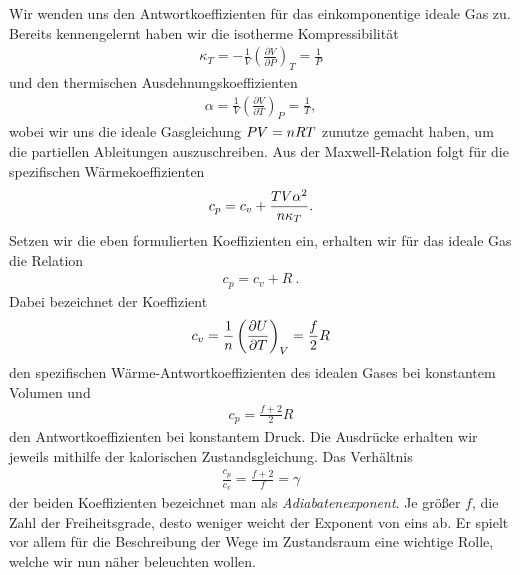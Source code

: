 Wir wenden uns den Antwortkoeffizienten für das einkomponentige ideale Gas zu. Bereits kennengelernt haben wir die isotherme Kompressibilität
\begin{align*}
    \kappa_T=-\frac{1}{V}\left(\frac{\partial V}{\partial P}\right)_T=\frac{1}{P}
\end{align*}
und den thermischen Ausdehnungskoeffizienten
\begin{align*}
    \alpha=\frac{1}{V}\left(\frac{\partial V}{\partial T}\right)_P=\frac{1}{T},
\end{align*}
wobei wir uns die ideale Gasgleichung $PV=n RT$ zunutze gemacht haben, um die partiellen Ableitungen auszuschreiben.
Aus der Maxwell-Relation folgt für die spezifischen Wärmekoeffizienten
\begin{align*}
    c_p=c_v+\frac{TV\alpha^2}{n \kappa_T}.
\end{align*}
Setzen wir die eben formulierten Koeffizienten ein, erhalten wir für das ideale Gas die Relation
\begin{align*}
    \boxed{c_p=c_v+R}\:.
\end{align*}
Dabei bezeichnet der Koeffizient
\begin{align*}
    c_v=\frac{1}{n }\left(\frac{\partial U}{\partial T}\right)_V=\frac{f}{2}R
\end{align*}
den spezifischen Wärme-Antwortkoeffizienten des idealen Gases bei konstantem Volumen und
\begin{align*}
    c_p=\frac{f+2}{2}R
\end{align*}
den Antwortkoeffizienten bei konstantem Druck. Die Ausdrücke erhalten wir jeweils mithilfe der kalorischen Zustandsgleichung.
Das Verhältnis
\begin{align*}
    \frac{c_p}{c_v}=\frac{f+2}{f}=\gamma
\end{align*}
der beiden Koeffizienten bezeichnet man als \emph{Adiabatenexponent}.
Je größer $f$, die Zahl der Freiheitsgrade, desto weniger weicht der Exponent von eins ab.
Er spielt vor allem für die Beschreibung der Wege im Zustandsraum eine wichtige Rolle, welche wir nun näher beleuchten wollen.

